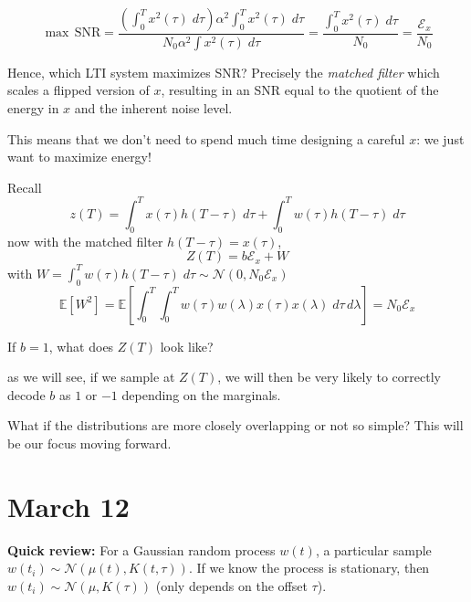 \documentclass[12pt]{report}
\newcommand{\E}{\mathbb{E}}
\newcommand{\Ec}{\mathcal{E}}
\newcommand{\Nc}{\mathcal{N}}
\newcommand*{\tbf}[1]{\ifmmode\mathbf{#1}\else\textbf{#1}\fi}
\begin{document}
\[\max\, \text{SNR} = \frac{\left(\int_0^T x^2(\tau)\; d\tau\right) \alpha^2 \int_0^T x^2(\tau)\; d\tau}{N_0 \alpha^2 \int x^2(\tau)\; d\tau} = \frac{\int_0^T x^2(\tau)\; d\tau}{N_0} = \frac{\Ec_x}{N_0}\]

Hence, which LTI system maximizes SNR? Precisely the \emph{matched filter} which scales a flipped version of $x$, resulting in an SNR equal to the quotient of the energy in $x$ and the inherent noise level. 

This means that we don't need to spend much time designing a careful $x$: we just want to maximize energy! 

Recall 
\[z(T) = \int_0^T x(\tau) h(T - \tau)\; d\tau + \int_0^T w(\tau)h(T - \tau) \; d\tau\]
now with the matched filter $h(T - \tau) = x(\tau)$, 
\[Z(T) = b \Ec_x + W\]
with $W = \int_0^T w(\tau) h(T - \tau)\; d\tau \sim \Nc(0, N_0 \Ec_x)$
\[\E[W^2] = \E[\int_0^T \int_0^T w(\tau) w(\lambda) x(\tau) x(\lambda)\; d\tau \, d\lambda] = N_0 \Ec_x\]

If $b = 1$, what does $Z(T)$ look like? 

\begin{center}
\end{center}

as we will see, if we sample at $Z(T)$, we will then be very likely to correctly decode $b$ as $1$ or $-1$ depending on the marginals. 

What if the distributions are more closely overlapping or not so simple? This will be our focus moving forward.

\section{March 12}

\tbf{Quick review:} For a Gaussian random process $w(t)$, a particular sample $w(t_i) \sim \Nc(\mu(t), K(t, \tau))$. If we know the process is stationary, then $w(t_i) \sim \Nc(\mu, K(\tau))$ (only depends on the offset $\tau$).
\end{document}
